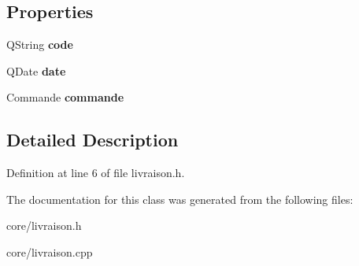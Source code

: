 \subsection*{Properties}
\begin{DoxyCompactItemize}
\item 
\hypertarget{class_livraison_ae8c3a787cc05a20a06d43acfe3c78418}{
QString {\bfseries code}}
\label{d4/d22/class_livraison_ae8c3a787cc05a20a06d43acfe3c78418}

\item 
\hypertarget{class_livraison_a3045054386f06bf6d51a1c8dc96aa554}{
QDate {\bfseries date}}
\label{d4/d22/class_livraison_a3045054386f06bf6d51a1c8dc96aa554}

\item 
\hypertarget{class_livraison_a5abe69344f87b1ec9f8a1a82a274ae45}{
Commande {\bfseries commande}}
\label{d4/d22/class_livraison_a5abe69344f87b1ec9f8a1a82a274ae45}

\end{DoxyCompactItemize}


\subsection{Detailed Description}


Definition at line 6 of file livraison.h.



The documentation for this class was generated from the following files:\begin{DoxyCompactItemize}
\item 
core/livraison.h\item 
core/livraison.cpp\end{DoxyCompactItemize}

